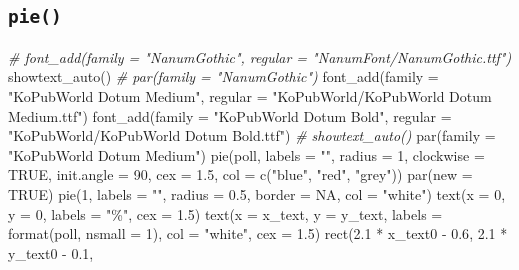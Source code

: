 \documentclass[
]{article}
\newenvironment{Shaded}{\begin{snugshade}}{\end{snugshade}}
\newcommand{\AttributeTok}[1]{\textcolor[rgb]{0.77,0.63,0.00}{#1}}
\newcommand{\CommentTok}[1]{\textcolor[rgb]{0.56,0.35,0.01}{\textit{#1}}}
\newcommand{\ConstantTok}[1]{\textcolor[rgb]{0.00,0.00,0.00}{#1}}
\newcommand{\DecValTok}[1]{\textcolor[rgb]{0.00,0.00,0.81}{#1}}
\newcommand{\FloatTok}[1]{\textcolor[rgb]{0.00,0.00,0.81}{#1}}
\newcommand{\FunctionTok}[1]{\textcolor[rgb]{0.00,0.00,0.00}{#1}}
\newcommand{\NormalTok}[1]{#1}
\newcommand{\SpecialCharTok}[1]{\textcolor[rgb]{0.00,0.00,0.00}{#1}}
\newcommand{\StringTok}[1]{\textcolor[rgb]{0.31,0.60,0.02}{#1}}
\begin{document}
\hypertarget{pie}{%
\subsection{\texorpdfstring{\texttt{pie()}}{pie()}}\label{pie}}

\begin{Shaded}
\begin{Highlighting}[]
\CommentTok{\# font\_add(family = "NanumGothic", regular = "NanumFont/NanumGothic.ttf")}
\FunctionTok{showtext\_auto}\NormalTok{()}
\CommentTok{\# par(family = "NanumGothic")}
\FunctionTok{font\_add}\NormalTok{(}\AttributeTok{family =} \StringTok{"KoPubWorld Dotum Medium"}\NormalTok{, }\AttributeTok{regular =} \StringTok{"KoPubWorld/KoPubWorld Dotum Medium.ttf"}\NormalTok{)}
\FunctionTok{font\_add}\NormalTok{(}\AttributeTok{family =} \StringTok{"KoPubWorld Dotum Bold"}\NormalTok{, }\AttributeTok{regular =} \StringTok{"KoPubWorld/KoPubWorld Dotum Bold.ttf"}\NormalTok{)}
\CommentTok{\# showtext\_auto()}
\FunctionTok{par}\NormalTok{(}\AttributeTok{family =} \StringTok{"KoPubWorld Dotum Medium"}\NormalTok{)}
\FunctionTok{pie}\NormalTok{(poll, }
    \AttributeTok{labels =} \StringTok{""}\NormalTok{, }
    \AttributeTok{radius =} \DecValTok{1}\NormalTok{,}
    \AttributeTok{clockwise =} \ConstantTok{TRUE}\NormalTok{, }
    \AttributeTok{init.angle =} \DecValTok{90}\NormalTok{, }
    \AttributeTok{cex =} \FloatTok{1.5}\NormalTok{,}
    \AttributeTok{col =} \FunctionTok{c}\NormalTok{(}\StringTok{"blue"}\NormalTok{, }\StringTok{"red"}\NormalTok{, }\StringTok{"grey"}\NormalTok{))}
\FunctionTok{par}\NormalTok{(}\AttributeTok{new =} \ConstantTok{TRUE}\NormalTok{)}
\FunctionTok{pie}\NormalTok{(}\DecValTok{1}\NormalTok{,}
    \AttributeTok{labels =} \StringTok{""}\NormalTok{,}
    \AttributeTok{radius =} \FloatTok{0.5}\NormalTok{,}
    \AttributeTok{border =} \ConstantTok{NA}\NormalTok{,}
    \AttributeTok{col =} \StringTok{"white"}\NormalTok{)}
\FunctionTok{text}\NormalTok{(}\AttributeTok{x =} \DecValTok{0}\NormalTok{, }\AttributeTok{y =} \DecValTok{0}\NormalTok{, }
     \AttributeTok{labels =} \StringTok{"\%"}\NormalTok{, }
     \AttributeTok{cex =} \FloatTok{1.5}\NormalTok{)}
\FunctionTok{text}\NormalTok{(}\AttributeTok{x =}\NormalTok{ x\_text, }\AttributeTok{y =}\NormalTok{ y\_text, }
     \AttributeTok{labels =} \FunctionTok{format}\NormalTok{(poll, }\AttributeTok{nsmall =} \DecValTok{1}\NormalTok{), }
     \AttributeTok{col =} \StringTok{"white"}\NormalTok{, }
     \AttributeTok{cex =} \FloatTok{1.5}\NormalTok{)}
\FunctionTok{rect}\NormalTok{(}\FloatTok{2.1} \SpecialCharTok{*}\NormalTok{ x\_text0 }\SpecialCharTok{{-}} \FloatTok{0.6}\NormalTok{, }\FloatTok{2.1} \SpecialCharTok{*}\NormalTok{ y\_text0 }\SpecialCharTok{{-}} \FloatTok{0.1}\NormalTok{, }

\end{Highlighting}
\end{Shaded}
\end{document}

